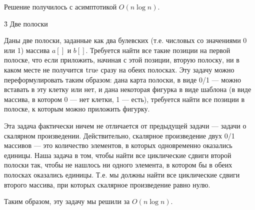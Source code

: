 Решение получилось с асимптотикой $O (n \log n)$.


\h3{ Две полоски }

Даны две полоски, заданные как два булевских (т.е. числовых со значениями 0 или 1) массива $a[]$ и $b[]$. Требуется найти все такие позиции на первой полоске, что если приложить, начиная с этой позиции, вторую полоску, ни в каком месте не получится $\rm true$ сразу на обеих полосках. Эту задачу можно переформулировать таким образом: дана карта полоски, в виде 0/1 --- можно вставать в эту клетку или нет, и дана некоторая фигурка в виде шаблона (в виде массива, в котором 0 --- нет клетки, 1 --- есть), требуется найти все позиции в полоске, к которым можно приложить фигурку.

Эта задача фактически ничем не отличается от предыдущей задачи --- задачи о скалярном произведении. Действительно, скалярное произведение двух 0/1 массивов --- это количество элементов, в которых одновременно оказались единицы. Наша задача в том, чтобы найти все циклические сдвиги второй полоски так, чтобы не нашлось ни одного элемента, в котором бы в обеих полосках оказались единицы. Т.е. мы должны найти все циклические сдвиги второго массива, при которых скалярное произведение равно нулю.

Таким образом, эту задачу мы решили за $O(n \log n)$.
